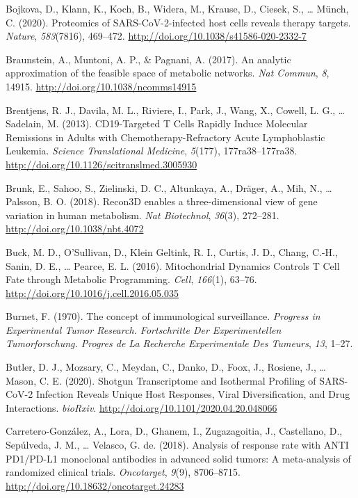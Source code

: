 \documentclass[12pt,twoside,openany,\mydriver]{thesis}  %
\begin{document}
\leavevmode\hypertarget{ref-bojkova_proteomics_2020}{}%
Bojkova, D., Klann, K., Koch, B., Widera, M., Krause, D., Ciesek, S., \ldots{} Münch, C. (2020). Proteomics of SARS-CoV-2-infected host cells reveals therapy targets. \emph{Nature}, \emph{583}(7816), 469--472. \url{http://doi.org/10.1038/s41586-020-2332-7}

\leavevmode\hypertarget{ref-braunstein_analytic_2017}{}%
Braunstein, A., Muntoni, A. P., \& Pagnani, A. (2017). An analytic approximation of the feasible space of metabolic networks. \emph{Nat Commun}, \emph{8}, 14915. \url{http://doi.org/10.1038/ncomms14915}

\leavevmode\hypertarget{ref-brentjens_cd19-targeted_2013}{}%
Brentjens, R. J., Davila, M. L., Riviere, I., Park, J., Wang, X., Cowell, L. G., \ldots{} Sadelain, M. (2013). CD19-Targeted T Cells Rapidly Induce Molecular Remissions in Adults with Chemotherapy-Refractory Acute Lymphoblastic Leukemia. \emph{Science Translational Medicine}, \emph{5}(177), 177ra38--177ra38. \url{http://doi.org/10.1126/scitranslmed.3005930}

\leavevmode\hypertarget{ref-brunk_recon3d_2018}{}%
Brunk, E., Sahoo, S., Zielinski, D. C., Altunkaya, A., Dräger, A., Mih, N., \ldots{} Palsson, B. O. (2018). Recon3D enables a three-dimensional view of gene variation in human metabolism. \emph{Nat Biotechnol}, \emph{36}(3), 272--281. \url{http://doi.org/10.1038/nbt.4072}

\leavevmode\hypertarget{ref-buck_mitochondrial_2016}{}%
Buck, M. D., O'Sullivan, D., Klein Geltink, R. I., Curtis, J. D., Chang, C.-H., Sanin, D. E., \ldots{} Pearce, E. L. (2016). Mitochondrial Dynamics Controls T Cell Fate through Metabolic Programming. \emph{Cell}, \emph{166}(1), 63--76. \url{http://doi.org/10.1016/j.cell.2016.05.035}

\leavevmode\hypertarget{ref-burnet_concept_1970}{}%
Burnet, F. (1970). The concept of immunological surveillance. \emph{Progress in Experimental Tumor Research. Fortschritte Der Experimentellen Tumorforschung. Progres de La Recherche Experimentale Des Tumeurs}, \emph{13}, 1--27.

\leavevmode\hypertarget{ref-butler_shotgun_2020}{}%
Butler, D. J., Mozsary, C., Meydan, C., Danko, D., Foox, J., Rosiene, J., \ldots{} Mason, C. E. (2020). Shotgun Transcriptome and Isothermal Profiling of SARS-CoV-2 Infection Reveals Unique Host Responses, Viral Diversification, and Drug Interactions. \emph{bioRxiv}. \url{http://doi.org/10.1101/2020.04.20.048066}

\leavevmode\hypertarget{ref-carretero-gonzalez_analysis_2018}{}%
Carretero-González, A., Lora, D., Ghanem, I., Zugazagoitia, J., Castellano, D., Sepúlveda, J. M., \ldots{} Velasco, G. de. (2018). Analysis of response rate with ANTI PD1/PD-L1 monoclonal antibodies in advanced solid tumors: A meta-analysis of randomized clinical trials. \emph{Oncotarget}, \emph{9}(9), 8706--8715. \url{http://doi.org/10.18632/oncotarget.24283}
\end{document}
